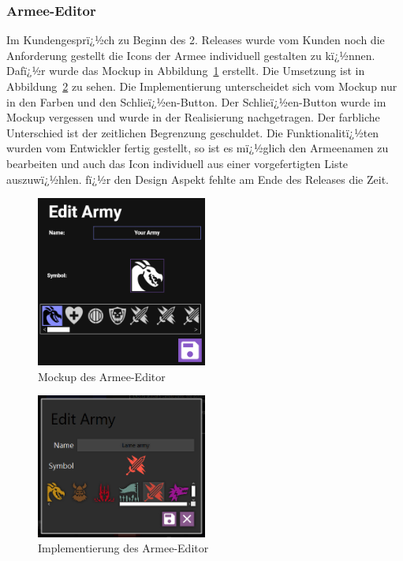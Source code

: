 \documentclass[12pt, titlepage]{scrartcl}
\newcommand{\Abb}[1]{%
	Abbildung\ \ref{#1}%
}
\begin{document}
			\subsubsection{Armee-Editor}
			Im Kundengesprï¿½ch zu Beginn des 2. Releases wurde vom Kunden noch die Anforderung gestellt die Icons der Armee individuell gestalten zu kï¿½nnen. Dafï¿½r wurde das Mockup in \Abb{ArmyEditorMockUp} erstellt. Die Umsetzung ist in \Abb{ArmyEditorImplementation} zu sehen. Die Implementierung unterscheidet sich vom Mockup nur in den Farben und den Schlieï¿½en-Button. Der Schlieï¿½en-Button wurde im Mockup vergessen und wurde in der Realisierung nachgetragen. Der farbliche Unterschied ist der zeitlichen Begrenzung geschuldet. Die Funktionalitï¿½ten wurden vom Entwickler fertig gestellt, so ist es mï¿½glich den Armeenamen zu bearbeiten und auch das Icon individuell aus einer vorgefertigten Liste auszuwï¿½hlen. fï¿½r den Design Aspekt fehlte am Ende des Releases die Zeit.
			
			\begin{figure}[H] 
				\centering
				\includegraphics[width=0.5\textwidth]{ArmyEditor.png}
				\caption{Mockup des Armee-Editor}
				\label{ArmyEditorMockUp}
			\end{figure}
		
			\begin{figure}[H] 
				\centering
				\includegraphics[width=0.5\textwidth]{ArmyEditor_final.PNG}
				\caption{Implementierung des Armee-Editor}
				\label{ArmyEditorImplementation}
			\end{figure}
		
\end{document}
